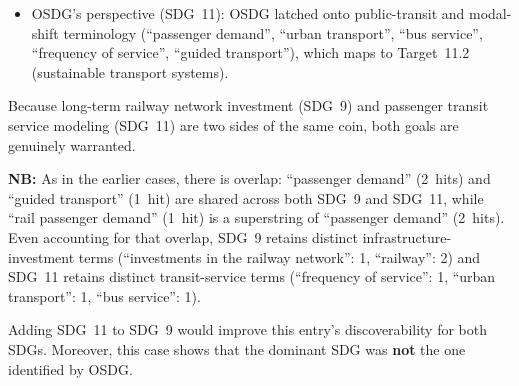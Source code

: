 \begin{casestudySection}
\begin{itemize}
    \item OSDG's perspective (\gls{SDG}~11): OSDG latched onto public-transit and modal-shift terminology (\enquote{passenger demand}, \enquote{urban transport}, \enquote{bus service}, \enquote{frequency of service}, \enquote{guided transport}), which maps to Target~11.2 (sustainable transport systems).
\end{itemize}

Because long-term railway network investment (\gls{SDG}~9) and passenger transit service modeling (\gls{SDG}~11) are two sides of the same coin, both goals are genuinely warranted.

\textbf{NB:} As in the earlier cases, there is overlap: \enquote{passenger demand} (2~hits) and \enquote{guided transport} (1~hit) are shared across both \gls{SDG}~9 and \gls{SDG}~11, while \enquote{rail passenger demand} (1~hit) is a superstring of \enquote{passenger demand} (2~hits). Even accounting for that overlap, \gls{SDG}~9 retains distinct infrastructure-investment terms (\enquote{investments in the railway network}: 1, \enquote{railway}: 2) and \gls{SDG}~11 retains distinct transit-service terms (\enquote{frequency of service}: 1, \enquote{urban transport}: 1, \enquote{bus service}: 1).
\end{casestudySection}

\begin{takeaway}
Adding \gls{SDG}~11 to \gls{SDG}~9 would improve this entry's discoverability for both \glspl{SDG}. Moreover, this case shows that the dominant \gls{SDG} was \textbf{not} the one identified by OSDG.
\end{takeaway}

